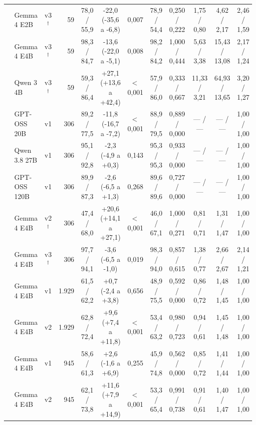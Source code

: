 \begin{table}[htbp!]
{\begin{tabular}{|l|l|c|r|c|c|c|c|c|c|c|c|}
 & Gemma 4 E2B & v3$^\dagger$ & 59 & 78,0 / 55,9 & -22,0 (-35,6 a -6,8) & 0,007 & 78,9 / 54,4 & 0,250 / 0,222 & 1,75 / 0,80 & 4,62 / 2,17 & 2,46 / 1,59 \\
 & Gemma 4 E4B & v3$^\dagger$ & 59 & 98,3 / 84,7 & -13,6 (-22,0 a -5,1) & 0,008 & 98,2 / 84,2 & 1,000 / 0,444 & 5,63 / 3,38 & 15,43 / 13,08 & 2,17 / 1,24 \\
 & Qwen 3 4B & v3$^\dagger$ & 59 & 59,3 / 86,4 & +27,1 (+13,6 a +42,4) & $<$\,0,001 & 57,9 / 86,0 & 0,333 / 0,667 & 11,33 / 3,21 & 64,93 / 13,65 & 3,20 / 1,27 \\
\hline
{} & GPT-OSS 20B & v1 & 306 & 89,2 / 77,5 & -11,8 (-16,7 a -7,2) & $<$\,0,001 & 88,9 / 79,5 & 0,889 / 0,000 & --- / --- & --- / --- & 1,00 / 1,00 \\
 & Qwen 3.8 27B & v1 & 306 & 95,1 / 92,8 & -2,3 (-4,9 a +0,3) & 0,143 & 95,3 / 95,3 & 0,933 / 0,000 & --- / --- & --- / --- & 1,00 / 1,00 \\
 & GPT-OSS 120B & v1 & 306 & 89,9 / 87,3 & -2,6 (-6,5 a +1,3) & 0,268 & 89,6 / 89,6 & 0,727 / 0,000 & --- / --- & --- / --- & 1,00 / 1,00 \\
\hline
{} & Gemma 4 E4B & v2$^\dagger$ & 306 & 47,4 / 68,0 & +20,6 (+14,1 a +27,1) & $<$\,0,001 & 46,0 / 67,1 & 1,000 / 0,271 & 0,81 / 0,71 & 1,31 / 1,47 & 1,00 / 1,00 \\
 & Gemma 4 E4B & v3$^\dagger$ & 306 & 97,7 / 94,1 & -3,6 (-6,5 a -1,0) & 0,019 & 98,3 / 94,0 & 0,857 / 0,615 & 1,38 / 0,77 & 2,66 / 2,67 & 2,14 / 1,21 \\
\hline
{} & Gemma 4 E4B & v1 & 1.929 & 61,5 / 62,2 & +0,7 (-2,4 a +3,8) & 0,656 & 48,9 / 75,5 & 0,592 / 0,000 & 0,86 / 0,72 & 1,48 / 1,45 & 1,00 / 1,00 \\
 & Gemma 4 E4B & v2 & 1.929 & 62,8 / 72,4 & +9,6 (+7,4 a +11,8) & $<$\,0,001 & 53,4 / 63,2 & 0,980 / 0,723 & 0,94 / 0,61 & 1,45 / 1,48 & 1,00 / 1,00 \\
\hline
{} & Gemma 4 E4B & v1 & 945 & 58,6 / 61,3 & +2,6 (-1,6 a +6,9) & 0,255 & 45,9 / 74,8 & 0,562 / 0,000 & 0,85 / 0,72 & 1,41 / 1,44 & 1,00 / 1,00 \\
 & Gemma 4 E4B & v2 & 945 & 62,1 / 73,8 & +11,6 (+7,9 a +14,9) & $<$\,0,001 & 53,3 / 65,4 & 0,991 / 0,738 & 0,91 / 0,61 & 1,40 / 1,47 & 1,00 / 1,00 \\

\end{tabular}}
\end{table}
